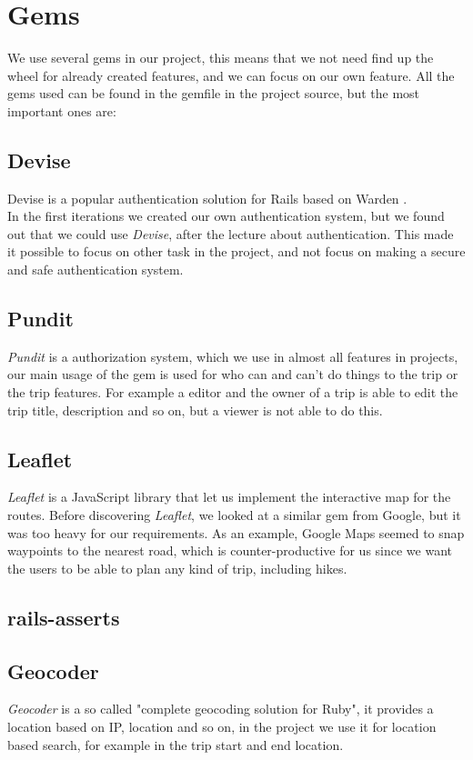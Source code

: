 \documentclass[a4paper]{article}
\begin{document}
\section{Gems}
We use several gems in our project, this means that we not need find up the wheel for already created features, and we can focus on our own feature. All the gems used can be found in the gemfile in the project source, but the most important ones are:
\subsection{Devise}
Devise is a popular authentication solution for Rails based on Warden \cite{devise}. \\
In the first iterations we created our own authentication system, but we found out that we could use \textit{Devise}, after the lecture about authentication. This made it possible to focus on other task in the project, and not focus on making a secure and safe authentication system. 

\subsection{Pundit}
\textit{Pundit} is a authorization system\cite{pundit}, which we use in almost all features in projects, our main usage of the gem is used for who can and can't do things to the trip or the trip features. For example a editor and the owner of a trip is able to edit the trip title, description and so on, but a viewer is not able to do this. 

\subsection{Leaflet}
\textit{Leaflet}\cite{leaflet} is a JavaScript library that let us implement the interactive map for the routes. Before discovering \textit{Leaflet}, we looked at a similar gem from Google, but it was too heavy for our requirements. As an example, Google Maps seemed to snap waypoints to the nearest road, which is counter-productive for us since we want the users to be able to plan any kind of trip, including hikes.

\subsection{rails-asserts}

\subsection{Geocoder}
\textit{Geocoder} is a so called "complete geocoding solution for Ruby"\cite{geocoder}, it provides a location based on IP, location and so on, in the project we use it for location based search, for example in the trip start and end location. 
\end{document}
